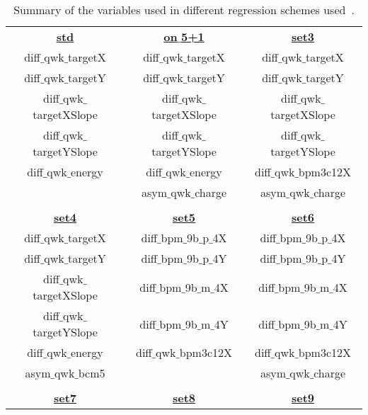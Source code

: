 %
\begin{singlespace}
\begin{table}[!h]
  	\caption
  	{Summary of the variables used in different regression schemes used~\cite{elog:nur_management5}.}
  \begin{tabular}{ c  c  c }
    \textbf{\underline{std}} & \textbf{\underline{on$\_$5+1}} & \textbf{\underline{set3}} \\ %
    diff$\_$qwk$\_$targetX       & diff$\_$qwk$\_$targetX 		& diff$\_$qwk$\_$targetX \\
    diff$\_$qwk$\_$targetY       & diff$\_$qwk$\_$targetY 		& diff$\_$qwk$\_$targetY \\
    diff$\_$qwk$\_$targetXSlope  & diff$\_$qwk$\_$targetXSlope 	& diff$\_$qwk$\_$targetXSlope \\
    diff$\_$qwk$\_$targetYSlope  & diff$\_$qwk$\_$targetYSlope 	& diff$\_$qwk$\_$targetYSlope \\
    diff$\_$qwk$\_$energy  	   	& diff$\_$qwk$\_$energy 			& diff$\_$qwk$\_$bpm3c12X \\
     							& asym$\_$qwk$\_$charge 			& asym$\_$qwk$\_$charge \\
	\\
    \textbf{\underline{set4}} & \textbf{\underline{set5}} & \textbf{\underline{set6}} \\ %
    diff$\_$qwk$\_$targetX & diff$\_$bpm$\_$9b$\_$p$\_$4X & diff$\_$bpm$\_$9b$\_$p$\_$4X \\
    diff$\_$qwk$\_$targetY & diff$\_$bpm$\_$9b$\_$p$\_$4Y & diff$\_$bpm$\_$9b$\_$p$\_$4Y \\
    diff$\_$qwk$\_$targetXSlope & diff$\_$bpm$\_$9b$\_$m$\_$4X & diff$\_$bpm$\_$9b$\_$m$\_$4X \\
    diff$\_$qwk$\_$targetYSlope & diff$\_$bpm$\_$9b$\_$m$\_$4Y & diff$\_$bpm$\_$9b$\_$m$\_$4Y \\
    diff$\_$qwk$\_$energy & diff$\_$qwk$\_$bpm3c12X & diff$\_$qwk$\_$bpm3c12X \\
    asym$\_$qwk$\_$bcm5 &  & asym$\_$qwk$\_$charge \\
	\\
    \textbf{\underline{set7}} & \textbf{\underline{set8}} & \textbf{\underline{set9}} \\ %

\end{tabular}
\end{table}
\end{singlespace}
